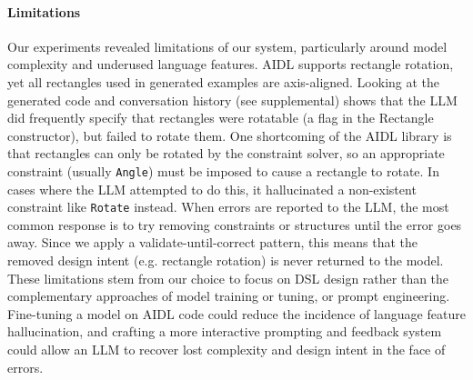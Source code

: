 \paragraph{Limitations}
Our experiments revealed limitations of our system, particularly around model complexity and underused language features. AIDL supports rectangle rotation, yet all rectangles used in generated examples are axis-aligned. Looking at the generated code and conversation history (see supplemental) shows that the LLM did frequently specify that rectangles were rotatable (a flag in the Rectangle constructor), but failed to rotate them. One shortcoming of the AIDL library is that rectangles can only be rotated by the constraint solver, so an appropriate constraint (usually \verb|Angle|) must be imposed to cause a rectangle to rotate. In cases where the LLM attempted to do this, it hallucinated a non-existent constraint like \verb|Rotate| instead. When errors are reported to the LLM, the most common response is to try removing constraints or structures until the error goes away. Since we apply a validate-until-correct pattern, this means that the removed design intent (e.g. rectangle rotation) is never returned to the model. These limitations stem from our choice to focus on DSL design rather than the complementary approaches of model training or tuning, or prompt engineering. Fine-tuning a model on AIDL code could reduce the incidence of language feature hallucination, and crafting a more interactive prompting and feedback system could allow an LLM to recover lost complexity and design intent in the face of errors.

